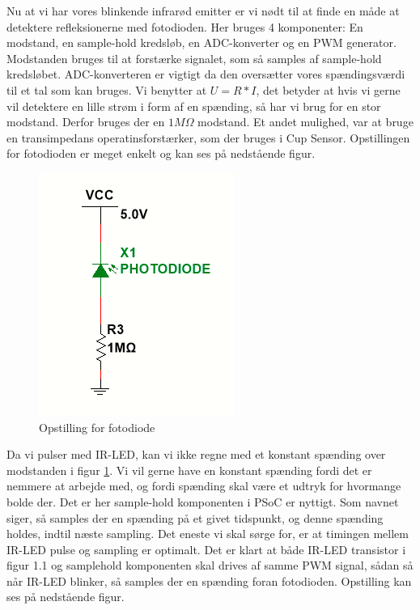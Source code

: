 \documentclass[HardwareDesign/HardwareDesign_main.tex]{subfiles}
\begin{document}
Nu at vi har vores blinkende infrarød emitter er vi nødt til at finde en måde at detektere refleksionerne med fotodioden. Her bruges 4 komponenter: En modstand, en sample-hold kredsløb, en ADC-konverter og en PWM generator. Modstanden bruges til at forstærke signalet, som så samples af sample-hold kredsløbet. ADC-konverteren er vigtigt da den oversætter vores spændingsværdi til et tal som kan bruges.
Vi benytter at $U=R*I$, det betyder at hvis vi gerne vil detektere en lille strøm i form af en spænding, så har vi brug for en stor modstand. Derfor bruges der en $1M\Omega$ modstand. Et andet mulighed, var at bruge en transimpedans operatinsforstærker, som der bruges i Cup Sensor. Opstillingen for fotodioden er meget enkelt og kan ses på nedstående figur.
\newpage
\begin{figure}
    \centering
    \includegraphics{HardwareDesign/Bolddispenser/graphics/Opstilling1_2.png}
    \caption{Opstilling for fotodiode}
    \label{fig:fotodiode_opstilling}
\end{figure}
Da vi pulser med IR-LED, kan vi ikke regne med et konstant spænding over modstanden i figur \ref{fig:fotodiode_opstilling}. Vi vil gerne have en konstant spænding fordi det er nemmere at arbejde med, og fordi spænding skal være et udtryk for hvormange bolde der. Det er her sample-hold komponenten i PSoC er nyttigt. Som navnet siger, så samples der en spænding på et givet tidspunkt, og denne spænding holdes, indtil næste sampling. Det eneste vi skal sørge for, er at timingen mellem IR-LED pulse og sampling er optimalt. Det er klart at både IR-LED transistor i figur 1.1 og samplehold komponenten skal drives af samme PWM signal, sådan så når IR-LED blinker, så samples der en spænding foran fotodioden. Opstilling kan ses på nedstående figur.
\newpage
\end{document}
